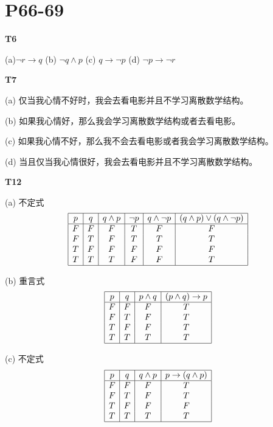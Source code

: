 \documentclass{article}
\begin{document}
\section{\textbf{P66-69}}

\textbf{T6}

(a)$\lnot r \rightarrow q$ \quad (b) $\lnot q \land p$ \quad (c) $q \rightarrow \lnot p$ \quad (d) $\lnot p \rightarrow \lnot r$

\vspace{10pt}

\textbf{T7}

(a) 仅当我心情不好时，我会去看电影并且不学习离散数学结构。

(b) 如果我心情好，那么我会学习离散数学结构或者去看电影。

(c) 如果我心情不好，那么我不会去看电影或者我会学习离散数学结构。

(d) 当且仅当我心情很好，我会去看电影并且不学习离散数学结构。

\vspace{10pt}

\textbf{T12}

(a) 不定式
\[
\begin{array}{|c|c|c|c|c|c|}
    \hline
    p & q & q \land p & \lnot p & q \land \lnot p & (q \land p) \lor (q \land \lnot p)\\
    \hline
    F & F & F & T & F & F\\
    F & T & F & T & T & T\\
    T & F & F & F & F & F\\
    T & T & T & F & F & T\\
    \hline
\end{array}
\]

(b) 重言式
\[
\begin{array}{|c|c|c|c|}
    \hline
    p & q & p \land q & (p \land q) \rightarrow p\\
    \hline
    F & F & F & T\\
    F & T & F & T\\
    T & F & F & T\\
    T & T & T & T\\
    \hline    
\end{array}
\]

(c) 不定式
\[
\begin{array}{|c|c|c|c|}
    \hline
    p & q & q \land p & p \rightarrow (q \land p)\\
    \hline
    F & F & F & T\\
    F & T & F & T\\
    T & F & F & F\\
    T & T & T & T\\
    \hline
\end{array}
\]
\end{document}
